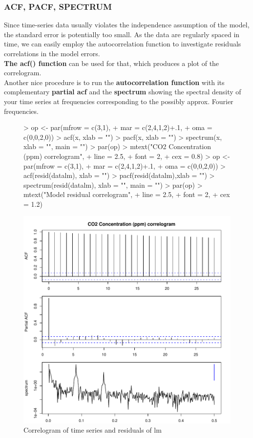 \documentclass[11pt, a4paper]{article} %
\begin{document}
\subsubsection{ACF, PACF, SPECTRUM}
\noindent Since time-series data usually violates the independence assumption of the model, the standard error is potentially too small. As the data are regularly spaced in time, we can easily employ the autocorrelation function to investigate residuals correlations in the model errors.\\
\textbf{The acf() function} can be used for that, which produces a plot of the correlogram.\\
Another nice procedure is to run the \textbf{autocorrelation function} with its complementary \textbf{partial acf} and the \textbf{spectrum} showing the spectral density of your time series at frequencies corresponding to the possibly approx. Fourier frequencies. \\
\begin{figure}[H]
\centering
\begin{Schunk}
\begin{Sinput}
> op <- par(mfrow = c(3,1),
+ mar = c(2,4,1,2)+.1,
+ oma = c(0,0,2,0))
> acf(x, xlab = "")
> pacf(x, xlab = "")
> spectrum(x, xlab = "", main = "")
> par(op)
> mtext("CO2 Concentration (ppm) correlogram",
+ line = 2.5,
+ font = 2,
+ cex = 0.8)
> op <- par(mfrow = c(3,1),
+ mar = c(2,4,1,2)+.1,
+ oma = c(0,0,2,0))
> acf(resid(datalm), xlab = "")
> pacf(resid(datalm),xlab = "")
> spectrum(resid(datalm), xlab = "", main = "")
> par(op)
> mtext("Model residual correlogram",
+ line = 2.5,
+ font = 2,
+ cex = 1.2)
\end{Sinput}
\end{Schunk}
\includegraphics{alles-correlogram}
\caption{Correlogram of time series and residuals of lm}
\label{correlogram}
\end{figure}
\end{document}
